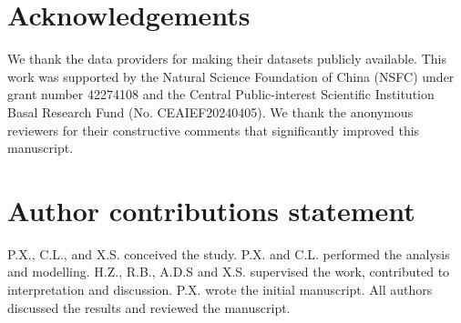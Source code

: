 \documentclass[fleqn,10pt]{wlscirep_mdpi_style}
\begin{document}
\section*{Acknowledgements}
We thank the data providers for making their datasets publicly available. This work was supported by the Natural Science Foundation of China (NSFC) under grant number 42274108 and the Central Public-interest Scientific Institution Basal Research Fund (No. CEAIEF20240405). We thank the anonymous reviewers for their constructive comments that significantly improved this manuscript.

\section*{Author contributions statement}
P.X., C.L., and X.S. conceived the study. P.X. and C.L. performed the analysis and modelling. H.Z., R.B., A.D.S and X.S. supervised the work, contributed to interpretation and discussion. P.X. wrote the initial manuscript. All authors discussed the results and reviewed the manuscript. 

\end{document}
